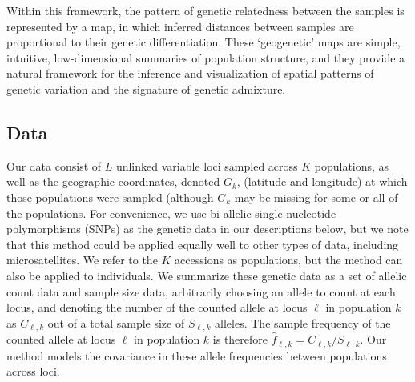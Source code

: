 \documentclass[12pt]{article}
\newcommand{\gb}[1]{{\em \color{magenta} #1}}
\begin{document}
Within this framework, the pattern of genetic relatedness between the samples is represented by a map, in which inferred distances between samples are proportional to their genetic differentiation.  These `geogenetic'  maps are simple, intuitive, low-dimensional summaries of population structure, and they provide a natural framework for the inference and visualization of spatial patterns of genetic variation and the signature of genetic admixture.




\subsection*{Data}
Our data consist of $L$ unlinked variable loci sampled across $K$ populations, as well as the geographic coordinates, denoted $G_k$, (latitude and longitude) at which those populations were sampled (although $G_k$ may be missing for some or all of the populations.  For convenience, we use bi-allelic single nucleotide polymorphisms (SNPs) as the genetic data in our descriptions below, but we note that this method could be applied equally well to other types of data, including microsatellites.  We refer to the $K$ accessions as populations, but the method can also be applied to individuals.  We summarize these genetic data as a set of allelic count data and sample size data, arbitrarily choosing an allele to count at each locus, and denoting the number of the counted allele at locus $\ell$ in population $k$ as $C_{\ell,k}$ out of a total sample size of $S_{\ell,k}$ alleles.  The sample frequency of the counted allele at locus $\ell$ in population $k$ is therefore $\hat{f}_{\ell,k} = C_{\ell,k}/S_{\ell,k}$.  Our method models the covariance in these allele frequencies between populations across loci.

\end{document}

